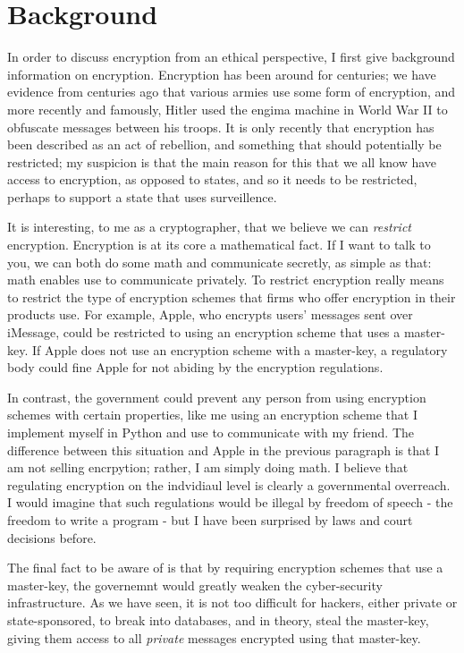 \documentclass[11pt]{article}
\begin{document}
\section{Background}
In order to discuss encryption from an ethical perspective, I first give background information on encryption.
Encryption has been around for centuries; we have evidence from centuries ago that various armies use some form of encryption, and more recently and famously, Hitler used the engima machine in World War II to obfuscate messages between his troops.
It is only recently that encryption has been described as an act of rebellion, and something that should potentially be restricted; my suspicion is that the main reason for this that we all know have access to encryption, as opposed to states, and so it needs to be restricted, perhaps to support a state that uses surveillence.

It is interesting, to me as a cryptographer, that we believe we can \textit{restrict} encryption.
Encryption is at its core a mathematical fact.
If I want to talk to you, we can both do some math and communicate secretly, as simple as that: math enables use to communicate privately.
To restrict encryption really means to restrict the type of encryption schemes that firms who offer encryption in their products use.
For example, Apple, who encrypts users' messages sent over iMessage, could be restricted to using an encryption scheme that uses a master-key.
If Apple does not use an encryption scheme with a master-key, a regulatory body could fine Apple for not abiding by the encryption regulations.

In contrast, the government could prevent any person from using encryption schemes with certain properties, like me using an encryption scheme that I implement myself in Python and use to communicate with my friend.
The difference between this situation and Apple in the previous paragraph is that I am not selling encrpytion; rather, I am simply doing math.
I believe that regulating encryption on the indvidiaul level is clearly a governmental overreach.
I would imagine that such regulations would be illegal by freedom of speech - the freedom to write a program - but I have been surprised by laws and court decisions before.

The final fact to be aware of is that by requiring encryption schemes that use a master-key, the governemnt would greatly weaken the cyber-security infrastructure.
As we have seen, it is not too difficult for hackers, either private or state-sponsored, to break into databases, and in theory, steal the master-key, giving them access to all \textit{private} messages encrypted using that master-key.
\end{document}
